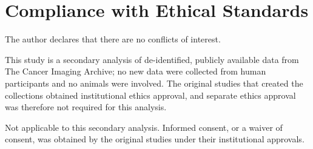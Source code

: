 \documentclass[pdflatex,iicol,sn-nature]{sn-jnl}
\begin{document}
\section*{Compliance with Ethical Standards}

The author declares that there are no conflicts of interest.

This study is a secondary analysis of de-identified, publicly available data from The Cancer Imaging Archive; no new data were collected from human participants and no animals were involved. The original studies that created the collections obtained institutional ethics approval, and separate ethics approval was therefore not required for this analysis.

Not applicable to this secondary analysis. Informed consent, or a waiver of consent, was obtained by the original studies under their institutional approvals.


\end{document}
